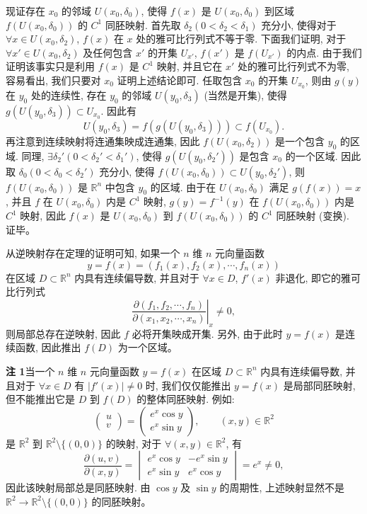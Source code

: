 \documentclass[UTF8,12pt,a4paper,fontset=fandol]{ctexart}
\begin{document}
现证存在 $x_0$ 的邻域 $U(x_0,\delta_0)$, 使得 $f(x)$ 是 $U(x_0,\delta_0)$ 到区域 $f(U(x_0,\delta_0))$ 的 $C^1$ 同胚映射. 首先取 $\delta_2(0<\delta_2<\delta_1)$ 充分小, 使得对于 $\forall x\in U(x_0,\delta_2)$, $f(x)$ 在 $x$ 处的雅可比行列式不等于零. 下面我们证明, 对于 $\forall x'\in U(x_0,\delta_2)$ 及任何包含 $x'$ 的开集 $U_{x'}$, $f(x')$ 是 $f(U_{x'})$ 的内点. 由于我们证明该事实只是利用 $f(x)$ 是 $C^1$ 映射, 并且它在 $x'$ 处的雅可比行列式不为零, 容易看出, 我们只要对 $x_0$ 证明上述结论即可. 任取包含 $x_0$ 的开集 $U_{x_0}$, 则由 $g(y)$ 在 $y_0$ 处的连续性, 存在 $y_0$ 的邻域 $U(y_0,\delta_3)$ (当然是开集), 使得 $g(U(y_0,\delta_3))\subset U_{x_0}$. 因此有
\[
  U(y_0,\delta_3)=f(g(U(y_0,\delta_3)))\subset f(U_{x_0}).
\]
再注意到连续映射将连通集映成连通集, 因此 $f(U(x_0,\delta_2))$ 是一个包含 $y_0$ 的区域. 同理, $\exists\delta_2'(0<\delta_2'<\delta_1')$, 使得 $g(U(y_0,\delta_2'))$ 是包含 $x_0$ 的一个区域. 因此取 $\delta_0(0<\delta_0<\delta_2')$ 充分小, 使得 $f(U(x_0,\delta_0))\subset U(y_0,\delta_2')$, 则 $f(U(x_0,\delta_0))$ 是 $\mathbb R^n$ 中包含 $y_0$ 的区域. 由于在 $U(x_0,\delta_0)$ 满足 $g(f(x))=x$, 并且 $f$ 在 $U(x_0,\delta_0)$ 内是 $C^1$ 映射, $g(y)=f^{-1}(y)$ 在 $f(U(x_0,\delta_0))$ 内是 $C^1$ 映射, 因此 $f(x)$ 是 $U(x_0,\delta_0)$ 到 $f(U(x_0,\delta_0))$ 的 $C^1$ 同胚映射 (变换). 证毕。

从逆映射存在定理的证明可知, 如果一个 $n$ 维 $n$ 元向量函数
\[
  y=f(x)=(f_1(x),f_2(x),\cdots,f_n(x))
\]
在区域 $D\subset\mathbb R^n$ 内具有连续偏导数, 并且对于 $\forall x\in D$, $f'(x)$ 非退化, 即它的雅可比行列式
\[
  \left.
  \frac{\partial(f_1,f_2,\cdots,f_n)}
       {\partial(x_1,x_2,\cdots,x_n)}
  \right|_x
  \ne0,
\]
则局部总存在逆映射, 因此 $f$ 必将开集映成开集. 另外, 由于此时 $y=f(x)$ 是连续函数, 因此推出 $f(D)$ 为一个区域。

\noindent\textbf{注 1}\quad 当一个 $n$ 维 $n$ 元向量函数 $y=f(x)$ 在区域 $D\subset\mathbb R^n$ 内具有连续偏导数, 并且对于 $\forall x\in D$ 有 $|f'(x)|\ne0$ 时, 我们仅仅能推出 $y=f(x)$ 是局部同胚映射, 但不能推出它是 $D$ 到 $f(D)$ 的整体同胚映射. 例如:
\[
  \begin{pmatrix}
    u\\
    v
  \end{pmatrix}
  =
  \begin{pmatrix}
    e^x\cos y\\
    e^x\sin y
  \end{pmatrix},
  \qquad (x,y)\in\mathbb R^2
\]
是 $\mathbb R^2$ 到 $\mathbb R^2\setminus\{(0,0)\}$ 的映射, 对于 $\forall(x,y)\in\mathbb R^2$, 有
\[
  \frac{\partial(u,v)}{\partial(x,y)}
  =
  \begin{vmatrix}
    e^x\cos y & -e^x\sin y\\
    e^x\sin y & e^x\cos y
  \end{vmatrix}
  =e^x\ne0,
\]
因此该映射局部总是同胚映射. 由 $\cos y$ 及 $\sin y$ 的周期性, 上述映射显然不是 $\mathbb R^2\to\mathbb R^2\setminus\{(0,0)\}$ 的同胚映射。
\end{document}
